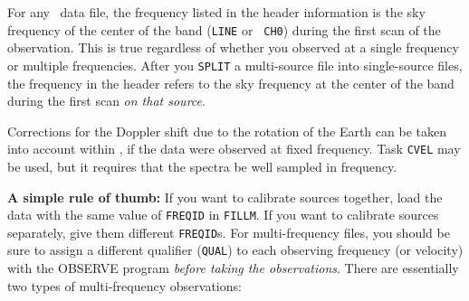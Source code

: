 





For any \uv\ data file, the frequency listed in the header information
is the sky frequency of the center of the band ({\tt LINE} or {\tt
CH0}) during the first scan of the observation.  This is true
regardless of whether you observed at a single frequency or multiple
frequencies.  After you {\tt SPLIT} a multi-source file into
single-source files, the frequency in the header refers to the sky
frequency at the center of the band during the first scan {\em on that
source}.

Corrections for the Doppler shift due to the rotation of the Earth
can be taken into account within \AIPS, if the data were observed at
fixed frequency.  Task {\tt CVEL} may be used, but it requires that
the spectra be well sampled in frequency.


{\bf A simple rule of thumb:} If you want to calibrate sources
together, load the data with the same value of {\tt FREQID} in
{\tt FILLM}\@.  If you want to calibrate sources separately, give
them different {\tt FREQID}s.  For multi-frequency files, you should
be sure to assign a different qualifier ({\tt QUAL}) to each observing
frequency (or velocity) with the OBSERVE program {\em before taking
the observations}.  There are essentially two types of multi-frequency
observations:

